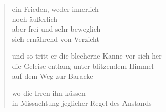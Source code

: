 \begin{verse}
ein Frieden, weder innerlich\\
noch äußerlich\\
aber frei und sehr beweglich\\
sich ernährend von Verzicht

und so tritt er die blecherne Kanne vor sich her\\
die Geleise entlang unter blitzendem Himmel\\
auf dem Weg zur Baracke

wo die Irren ihn küssen\\
in Missachtung jeglicher Regel des Anstands

\end{verse}

\clearpage


